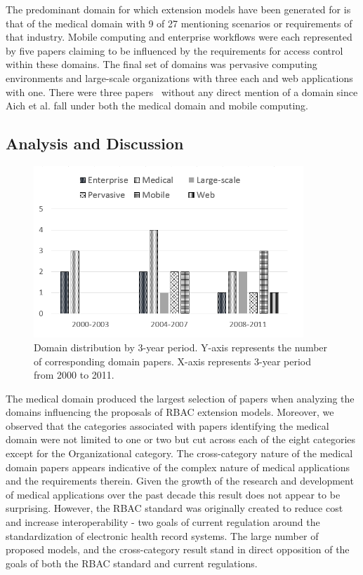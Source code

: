 The predominant domain for which extension models have been generated for is that of the medical domain with 9 of 27 mentioning scenarios or requirements of that industry.
Mobile computing and enterprise workflows were each represented by five papers claiming to be influenced by the requirements for access control within these domains. The final set
of domains was pervasive computing environments and large-scale organizations with three each and web applications with one.  There were three papers~\cite{jian2008extended, aich07:STARBAC, haibo2005context} without any direct mention of a domain since Aich et al. \cite{aich09:role} fall under both the medical domain and mobile computing.

\subsection{Analysis and Discussion}

\begin{figure}[ht]
    \centering
        \includegraphics[width=4.0in]{sections/dist_domains_byYear.png}
\vspace{-0.2 in}
    \caption{\label{fig:dist_domains}Domain distribution by 3-year period. Y-axis represents the number of corresponding domain papers.
    X-axis represents 3-year period from 2000 to 2011.}
\end{figure}

The medical domain produced the largest selection of papers when analyzing the domains influencing the proposals of RBAC extension models.  
Moreover, we observed that the categories associated with papers identifying the medical domain were not limited to one or two but cut across
each of the eight categories except for the Organizational category. 
The cross-category nature of the medical domain papers appears indicative of the complex nature of medical applications and the requirements therein.
Given the growth of the research and development of medical applications over the past decade this result does not appear to be surprising. However,
the RBAC standard was originally created to reduce cost and increase interoperability - two goals of current regulation around the standardization
of electronic health record systems. The large number of proposed models, and the cross-category result stand in direct opposition of the goals
of both the RBAC standard and current regulations.

